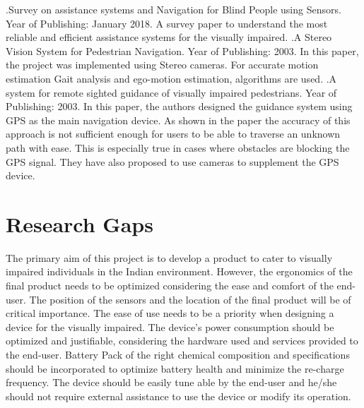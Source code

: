 \documentclass[conference]{IEEEtran}
\begin{document}
\newline[4].Survey on assistance systems and Navigation for Blind People using Sensors. Year of Publishing: January 2018. \newline
\newline A survey paper to understand the most reliable and efficient assistance systems for the visually impaired. \newline
\newline[5].A Stereo Vision System for Pedestrian Navigation. Year of Publishing: 2003. \newline
\newline In this paper, the project was implemented using Stereo cameras. For accurate motion estimation Gait analysis and ego-motion estimation, algorithms are used. \newline
\newline[6].A system for remote sighted guidance of visually impaired pedestrians. Year of Publishing: 2003. \newline
\newline In this paper, the authors designed the guidance system using GPS as the main navigation device. As shown in the paper the accuracy of this approach is not sufficient enough for users to be able to traverse an unknown path with ease. This is especially true in cases where obstacles are blocking the GPS signal. They have also proposed to use cameras to supplement the GPS device.


\section{Research Gaps}
The primary aim of this project is to develop a product to cater to visually impaired individuals in the Indian environment. However, the ergonomics of the final product needs to be optimized considering the ease and comfort of the end-user. The position of the sensors and the location of the final product will be of critical importance. The ease of use needs to be a priority when designing a device for the visually impaired. The device's power consumption should be optimized and justifiable, considering the hardware used and services provided to the end-user. Battery Pack of the right chemical composition and specifications should be incorporated to optimize battery health and minimize the re-charge frequency. The device should be easily tune able by the end-user and he/she should not require external assistance to use the device or modify its operation.
\end{document}
